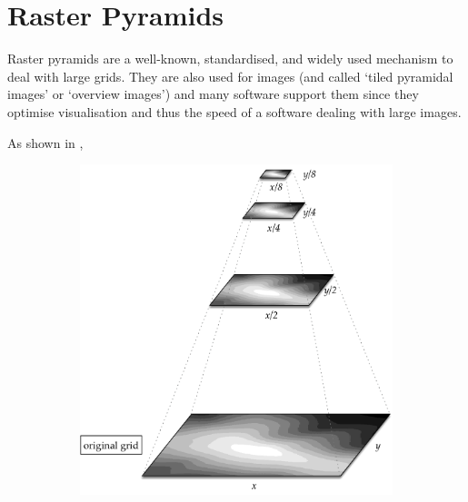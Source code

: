 %
\section{Raster Pyramids}%

Raster pyramids are a well-known, standardised, and widely used mechanism to deal with large grids.
They are also used for images (and called `tiled pyramidal images' or `overview images') and many software support them since they optimise visualisation and thus the speed of a software dealing with large images.

As shown in , 
\begin{figure}
  \centering
  \begin{subfigure}[b]{0.65\linewidth}
    \centering
    \includegraphics[width=\textwidth]{figs/pyramids.pdf}
    \caption{}
  \end{subfigure}
  \qquad%
  \begin{subfigure}[b]{0.2\linewidth}
    \centering

\end{subfigure}
\end{figure}
